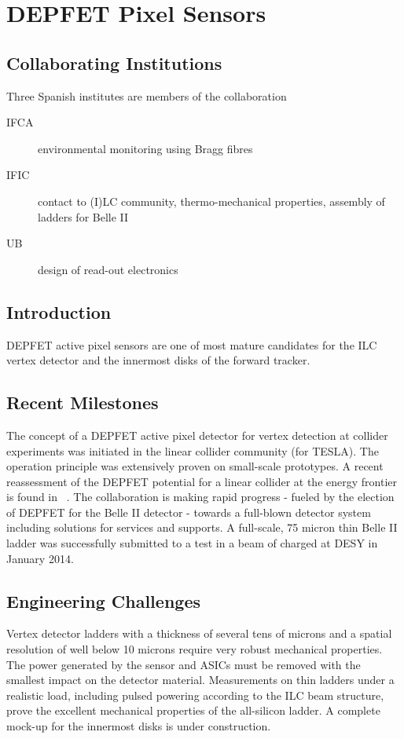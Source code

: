 \section{DEPFET Pixel Sensors}
\subsection{Collaborating Institutions}
Three Spanish institutes are members of the collaboration
\begin{description}
\item[IFCA]{environmental monitoring using Bragg fibres}
\item[IFIC]{contact to (I)LC community, thermo-mechanical properties, assembly of ladders for Belle II}
\item[UB]{design of read-out electronics}
\end{description}
\subsection{Introduction}
DEPFET active pixel sensors are one of most mature candidates for the ILC vertex detector and the innermost disks of the forward tracker.
\subsection{Recent Milestones}
The concept of a DEPFET active pixel detector for vertex detection at collider experiments was initiated in the linear collider community (for TESLA).
The operation principle was extensively proven on small-scale prototypes. A recent reassessment of the DEPFET potential for a linear collider at the energy frontier is found in ~\cite{6484214}.
The collaboration is making rapid progress - fueled by the election of DEPFET for the Belle II detector - towards a full-blown detector system including solutions for services and supports.
A full-scale, 75 micron thin Belle II ladder was successfully submitted to a test in a beam of charged at DESY in January 2014.

\subsection{Engineering Challenges}
Vertex detector ladders with a thickness of several tens of microns and a spatial resolution of well below 10 microns require very robust mechanical properties. The power generated by the sensor and ASICs must be removed with the smallest impact on the detector material.
Measurements on thin ladders under a realistic load, including pulsed powering according to the ILC beam structure, prove the excellent mechanical properties of the all-silicon ladder. A complete mock-up for the innermost disks is under construction.

